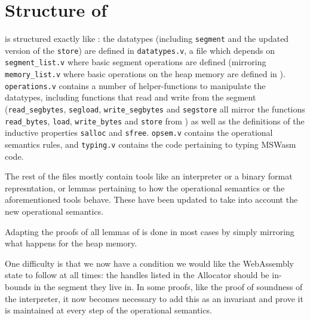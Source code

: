 \documentclass[a4paper]{article}
\begin{document}
\section{Structure of \irismswasm}

\irismswasm is structured exactly like \iriswasm: the datatypes (including {\tt segment} and the updated version of the {\tt store}) are defined in {\tt datatypes.v}, a file which depends on {\tt segment\_list.v} where basic segment operations are defined (mirroring {\tt memory\_list.v} where basic operations on the heap memory are defined in \iriswasm). {\tt operations.v} contains a number of helper-functions to manipulate the datatypes, including functions that read and write from the segment ({\tt read\_segbytes}, {\tt segload}, {\tt write\_segbytes} and {\tt segstore} all mirror the functions {\tt read\_bytes}, {\tt load}, {\tt write\_bytes} and {\tt store} from \iriswasm) as well as the definitions of the inductive properties {\tt salloc} and {\tt sfree}. {\tt opsem.v} contains the operational semantics rules, and {\tt typing.v} contains the code pertaining to typing MSWasm code.

The rest of the files mostly contain tools like an interpreter or a binary format represntation, or lemmas pertaining to how the operational semantics or the aforementioned tools behave. These have been updated to take into account the new operational semantics.

Adapting the proofs of all lemmas of \iriswasm is done in most cases by simply mirroring what happens for the heap memory.

One difficulty is that we now have a condition we would like the WebAssembly state to follow at all times: the handles listed in the Allocator should be in-bounds in the segment they live in. In some proofs, like the proof of soundness of the interpreter, it now becomes necessary to add this as an invariant and prove it is maintained at every step of the operational semantics.



\end{document}
